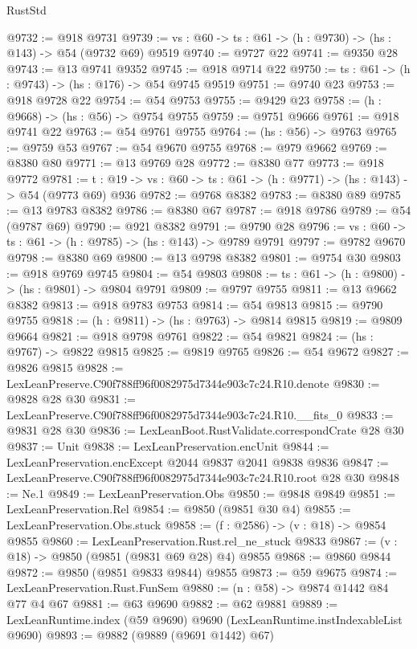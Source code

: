 \begin{lexlean}{RustStd}
\begin{coremodule}
@9732 := @918 @9731
@9739 := {vs : @60} -> {ts : @61} -> (h : @9730) -> (hs : @143) -> @54 (@9732 @69) @9519
@9740 := @9727 @22
@9741 := @9350 @28
@9743 := @13 @9741 @9352
@9745 := @918 @9714 @22
@9750 := {ts : @61} -> (h : @9743) -> (hs : @176) -> @54 @9745 @9519
@9751 := @9740 @23
@9753 := @918 @9728 @22
@9754 := @54 @9753
@9755 := @9429 @23
@9758 := (h : @9668) -> (hs : @56) -> @9754 @9755
@9759 := @9751 @9666
@9761 := @918 @9741 @22
@9763 := @54 @9761 @9755
@9764 := (hs : @56) -> @9763
@9765 := @9759 @53
@9767 := @54 @9670 @9755
@9768 := @979 @9662
@9769 := @8380 @80
@9771 := @13 @9769 @28
@9772 := @8380 @77
@9773 := @918 @9772
@9781 := {t : @19} -> {vs : @60} -> {ts : @61} -> (h : @9771) -> (hs : @143) -> @54 (@9773 @69) @936
@9782 := @9768 @8382
@9783 := @8380 @89
@9785 := @13 @9783 @8382
@9786 := @8380 @67
@9787 := @918 @9786
@9789 := @54 (@9787 @69)
@9790 := @921 @8382
@9791 := @9790 @28
@9796 := {vs : @60} -> {ts : @61} -> (h : @9785) -> (hs : @143) -> @9789 @9791
@9797 := @9782 @9670
@9798 := @8380 @69
@9800 := @13 @9798 @8382
@9801 := @9754 @30
@9803 := @918 @9769 @9745
@9804 := @54 @9803
@9808 := {ts : @61} -> (h : @9800) -> (hs : @9801) -> @9804 @9791
@9809 := @9797 @9755
@9811 := @13 @9662 @8382
@9813 := @918 @9783 @9753
@9814 := @54 @9813
@9815 := @9790 @9755
@9818 := (h : @9811) -> (hs : @9763) -> @9814 @9815
@9819 := @9809 @9664
@9821 := @918 @9798 @9761
@9822 := @54 @9821
@9824 := (hs : @9767) -> @9822 @9815
@9825 := @9819 @9765
@9826 := @54 @9672
@9827 := @9826 @9815
@9828 := LexLeanPreserve.C90f788ff96f0082975d7344e903c7c24.R10.denote
@9830 := @9828 @28 @30
@9831 := LexLeanPreserve.C90f788ff96f0082975d7344e903c7c24.R10.__fits_0
@9833 := @9831 @28 @30
@9836 := LexLeanBoot.RustValidate.correspondCrate @28 @30
@9837 := Unit
@9838 := LexLeanPreservation.encUnit
@9844 := LexLeanPreservation.encExcept @2044 @9837 @2041 @9838 @9836
@9847 := LexLeanPreserve.C90f788ff96f0082975d7344e903c7c24.R10.root @28 @30
@9848 := Ne.{1}
@9849 := LexLeanPreservation.Obs
@9850 := @9848 @9849
@9851 := LexLeanPreservation.Rel
@9854 := @9850 (@9851 @30 @4)
@9855 := LexLeanPreservation.Obs.stuck
@9858 := (f : @2586) -> (v : @18) -> @9854 @9855
@9860 := LexLeanPreservation.Rust.rel_ne_stuck @9833
@9867 := (v : @18) -> @9850 (@9851 (@9831 @69 @28) @4) @9855
@9868 := @9860 @9844
@9872 := @9850 (@9851 @9833 @9844) @9855
@9873 := @59 @9675
@9874 := LexLeanPreservation.Rust.FunSem
@9880 := (n : @58) -> @9874 @1442 @84 @77 @4 @67
@9881 := @63 @9690
@9882 := @62 @9881
@9889 := LexLeanRuntime.index (@59 @9690) @9690 (LexLeanRuntime.instIndexableList @9690)
@9893 := @9882 (@9889 (@9691 @1442) @67)

\end{coremodule}
\end{lexlean}
